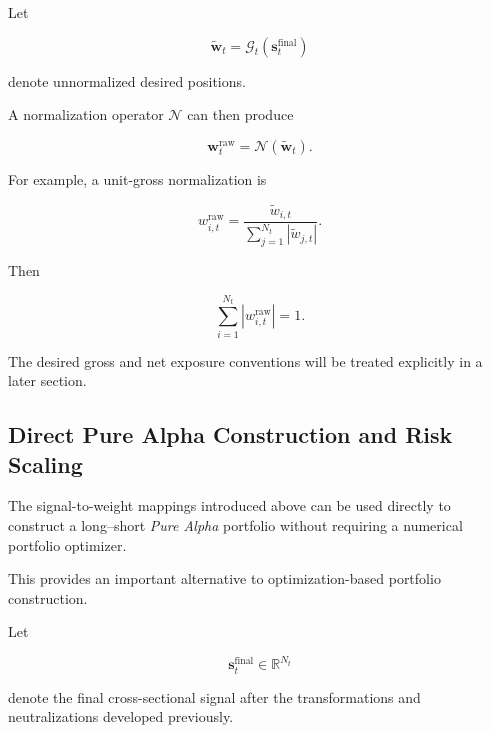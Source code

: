 \documentclass[11pt,a4paper]{article}
\begin{document}
Let

\begin{equation}
\widetilde{\mathbf{w}}_t
=
\mathcal{G}_t
\left(
\mathbf{s}_t^{\mathrm{final}}
\right)
\end{equation}

denote unnormalized desired positions.

A normalization operator $\mathcal{N}$ can then produce

\begin{equation}
\boxed{
\mathbf{w}_t^{\mathrm{raw}}
=
\mathcal{N}
\left(
\widetilde{\mathbf{w}}_t
\right).
}
\end{equation}

For example, a unit-gross normalization is

\begin{equation}
\boxed{
w_{i,t}^{\mathrm{raw}}
=
\frac{
\widetilde{w}_{i,t}
}{
\sum_{j=1}^{N_t}
\left|
\widetilde{w}_{j,t}
\right|
}.
}
\end{equation}

Then

\begin{equation}
\sum_{i=1}^{N_t}
\left|
w_{i,t}^{\mathrm{raw}}
\right|
=
1.
\end{equation}

The desired gross and net exposure conventions will be treated explicitly in a
later section.

\subsection{Direct Pure Alpha Construction and Risk Scaling}
\label{subsec:direct_pure_alpha_construction}

The signal-to-weight mappings introduced above can be used directly to construct
a long--short \emph{Pure Alpha} portfolio without requiring a numerical
portfolio optimizer.

This provides an important alternative to optimization-based portfolio
construction.

Let

\begin{equation}
\mathbf{s}_t^{\mathrm{final}}
\in
\mathbb{R}^{N_t}
\end{equation}

denote the final cross-sectional signal after the transformations and
neutralizations developed previously.
\end{document}
